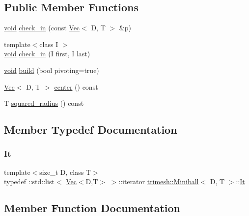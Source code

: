 \subsection*{Public Member Functions}
\begin{DoxyCompactItemize}
\item 
\hyperlink{namespacetrimesh_a784ddfd979e1c579bda795a8edfc3f43}{void} \hyperlink{classtrimesh_1_1Miniball_a0ee2a2ebd9f7ae4aa244c3cb6107f918}{check\+\_\+in} (const \hyperlink{classtrimesh_1_1Vec}{Vec}$<$ D, T $>$ \&p)
\item 
{\footnotesize template$<$class I $>$ }\\\hyperlink{namespacetrimesh_a784ddfd979e1c579bda795a8edfc3f43}{void} \hyperlink{classtrimesh_1_1Miniball_af8f5930b697218850797afb8d26f2cdf}{check\+\_\+in} (I first, I last)
\item 
\hyperlink{namespacetrimesh_a784ddfd979e1c579bda795a8edfc3f43}{void} \hyperlink{classtrimesh_1_1Miniball_a7d421e68176268820973a131484eda78}{build} (bool pivoting=true)
\item 
\hyperlink{classtrimesh_1_1Vec}{Vec}$<$ D, T $>$ \hyperlink{classtrimesh_1_1Miniball_a478104adc53e913dc98079b3c00777c7}{center} () const
\item 
T \hyperlink{classtrimesh_1_1Miniball_ad1db83272bb094fdec06c4376dca19c5}{squared\+\_\+radius} () const
\end{DoxyCompactItemize}


\subsection{Member Typedef Documentation}
\mbox{\label{classtrimesh_1_1Miniball_ab8d1a486a6e2cfda9f6be938180ab3aa}} 
\subsubsection{\texorpdfstring{It}{It}}
{\footnotesize\ttfamily template$<$size\+\_\+t D, class T$>$ \\
typedef \+::std\+::list$<$ \hyperlink{classtrimesh_1_1Vec}{Vec}$<$D,T$>$ $>$\+::iterator \hyperlink{classtrimesh_1_1Miniball}{trimesh\+::\+Miniball}$<$ D, T $>$\+::\hyperlink{classtrimesh_1_1Miniball_ab8d1a486a6e2cfda9f6be938180ab3aa}{It}}



\subsection{Member Function Documentation}
\mbox{\label{classtrimesh_1_1Miniball_a7d421e68176268820973a131484eda78}} 
